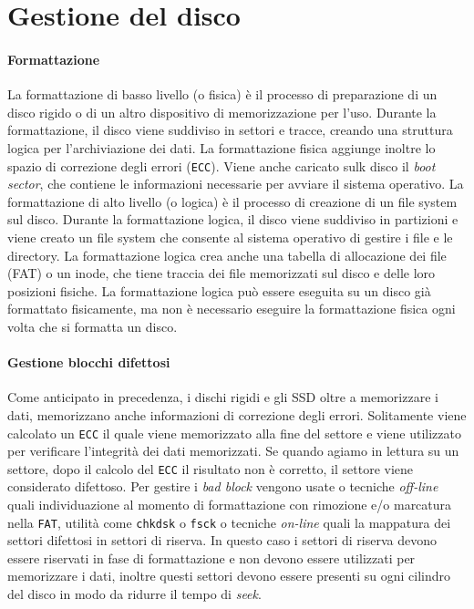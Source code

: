 \section{Gestione del disco}
    \paragraph{Formattazione}
        La formattazione di basso livello (o fisica) è il processo di preparazione di un disco rigido o di un altro dispositivo di memorizzazione per l'uso. Durante la formattazione, il disco viene suddiviso in settori e tracce, creando una struttura logica per l'archiviazione dei dati. La formattazione fisica aggiunge inoltre lo spazio di correzione degli errori (\texttt{ECC}). Viene anche caricato sulk disco il \textit{boot sector}, che contiene le informazioni necessarie per avviare il sistema operativo. \newline
        La formattazione di alto livello (o logica) è il processo di creazione di un file system sul disco. Durante la formattazione logica, il disco viene suddiviso in partizioni e viene creato un file system che consente al sistema operativo di gestire i file e le directory. La formattazione logica crea anche una tabella di allocazione dei file (FAT) o un inode, che tiene traccia dei file memorizzati sul disco e delle loro posizioni fisiche. La formattazione logica può essere eseguita su un disco già formattato fisicamente, ma non è necessario eseguire la formattazione fisica ogni volta che si formatta un disco.
    \paragraph{Gestione blocchi difettosi}
        Come anticipato in precedenza, i dischi rigidi e gli SSD oltre a memorizzare i dati, memorizzano anche informazioni di correzione degli errori. Solitamente viene calcolato un \texttt{ECC} il quale viene memorizzato alla fine del settore e viene utilizzato per verificare l'integrità dei dati memorizzati. Se quando agiamo in lettura su un settore, dopo il calcolo del \texttt{ECC} il risultato non è corretto, il settore viene considerato difettoso. Per gestire i \textit{bad block} vengono usate o tecniche \textit{off-line} quali individuazione al momento di formattazione con rimozione e/o marcatura nella \texttt{FAT}, utilità come \texttt{chkdsk} o \texttt{fsck} o tecniche \textit{on-line} quali la mappatura dei settori difettosi in settori di riserva. In questo caso i settori di riserva devono essere riservati in fase di formattazione e non devono essere utilizzati per memorizzare i dati, inoltre questi settori devono essere presenti su ogni cilindro del disco in modo da ridurre il tempo di \textit{seek}.
